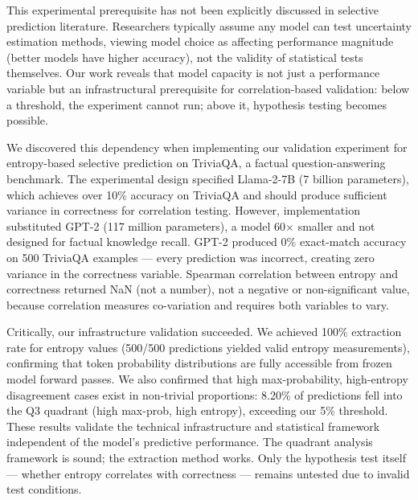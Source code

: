 This experimental prerequisite has not been explicitly discussed in selective prediction literature. Researchers typically assume any model can test uncertainty estimation methods, viewing model choice as affecting performance magnitude (better models have higher accuracy), not the validity of statistical tests themselves. Our work reveals that model capacity is not just a performance variable but an infrastructural prerequisite for correlation-based validation: below a threshold, the experiment cannot run; above it, hypothesis testing becomes possible.

We discovered this dependency when implementing our validation experiment for entropy-based selective prediction on TriviaQA, a factual question-answering benchmark. The experimental design specified Llama-2-7B (7 billion parameters), which achieves over 10\% accuracy on TriviaQA and should produce sufficient variance in correctness for correlation testing. However, implementation substituted GPT-2 (117 million parameters), a model 60$\times$ smaller and not designed for factual knowledge recall. GPT-2 produced 0\% exact-match accuracy on 500 TriviaQA examples --- every prediction was incorrect, creating zero variance in the correctness variable. Spearman correlation between entropy and correctness returned NaN (not a number), not a negative or non-significant value, because correlation measures co-variation and requires both variables to vary.

Critically, our infrastructure validation succeeded. We achieved 100\% extraction rate for entropy values (500/500 predictions yielded valid entropy measurements), confirming that token probability distributions are fully accessible from frozen model forward passes. We also confirmed that high max-probability, high-entropy disagreement cases exist in non-trivial proportions: 8.20\% of predictions fell into the Q3 quadrant (high max-prob, high entropy), exceeding our 5\% threshold. These results validate the technical infrastructure and statistical framework independent of the model's predictive performance. The quadrant analysis framework is sound; the extraction method works. Only the hypothesis test itself --- whether entropy correlates with correctness --- remains untested due to invalid test conditions.

